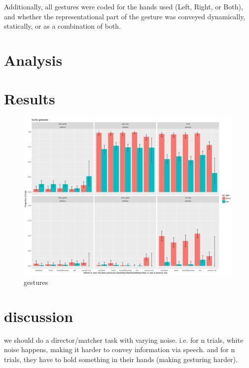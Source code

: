 \documentclass[a4paper,man,natbib]{apa6}
\begin{document}
Additionally, all gestures were coded for the hands used (Left, Right, or Both), and whether the representational part of the gesture was conveyed dynamically, statically, or as a combination of both. 

\section{Analysis}




\section{Results}
\begin{figure}
  \centering
	\includegraphics[width=\linewidth]{previousplot.png}
  \caption{gestures}
  \label{fig:plot}
\end{figure}

\section{discussion}
we should do a director/matcher task with varying noise. i.e. for n trials, white noise happens, making it harder to convey information via speech.
and for n trials, they have to hold something in their hands (making gesturing harder).






\end{document}
